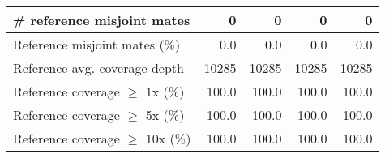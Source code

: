\documentclass[12pt,a4paper]{article}
\begin{document}
\begin{table}[ht]
\begin{center}
\begin{tabular}{|l*{4}{|r}|}
\# reference misjoint mates & 0 & 0 & 0 & 0 \\ \hline
Reference misjoint mates (\%) & 0.0 & 0.0 & 0.0 & 0.0 \\ \hline
Reference avg. coverage depth & 10285 & 10285 & 10285 & 10285 \\ \hline
Reference coverage $\geq$ 1x (\%) & 100.0 & 100.0 & 100.0 & 100.0 \\ \hline
Reference coverage $\geq$ 5x (\%) & 100.0 & 100.0 & 100.0 & 100.0 \\ \hline
Reference coverage $\geq$ 10x (\%) & 100.0 & 100.0 & 100.0 & 100.0 \\ \hline
\end{tabular}
\end{center}
\end{table}
\end{document}
